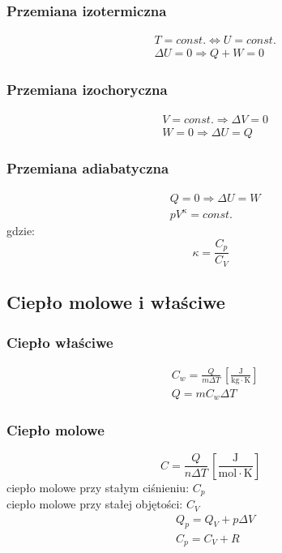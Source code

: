 \documentclass{article}
\numberwithin{equation}{section}
\newcommand{\unit}[1]{\, \left[\mathrm{#1}\right]}
\begin{document}
      \subsubsection{Przemiana izotermiczna}
        \begin{align}
          &T = const. \Leftrightarrow U = const.\\
          &\Delta U = 0 \Rightarrow Q + W = 0
        \end{align}
      \subsubsection{Przemiana izochoryczna}
        \begin{align}
          &V = const. \Rightarrow \Delta V = 0\\
          &W = 0 \Rightarrow \Delta U = Q
        \end{align}
      \subsubsection{Przemiana adiabatyczna}
        \begin{align}
          &Q = 0 \Rightarrow \Delta U = W\\
          &pV^\kappa = const.
        \end{align}
        gdzie:
        \begin{equation}
          \kappa = \frac{C_p}{C_V}
        \end{equation}
    \subsection{Ciepło molowe i właściwe}
      \subsubsection{Ciepło właściwe}
        \begin{align}
          &C_w = \frac{Q}{m\Delta T} \unit{\frac{J}{kg\cdot K}}\\
          &Q = mC_w\Delta T
        \end{align}
      \subsubsection{Ciepło molowe}
        \begin{equation}
          C = \frac{Q}{n\Delta T} \unit{\frac{J}{mol\cdot K}}
        \end{equation}
        ciepło molowe przy stałym ciśnieniu: $C_p$\\
        ciepło molowe przy stałej objętości: $C_V$
        \begin{align}
          &Q_p = Q_V + p\Delta V\\
          &C_p = C_V + R
        \end{align}
\end{document}
